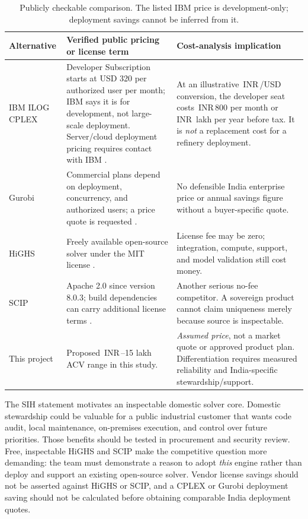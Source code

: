 \documentclass[11pt,a4paper]{article}
\newcommand{\inr}{\ifmmode\text{INR}\,\else INR\,\fi}
\newcommand{\lac}{\ifmmode\,\text{lakh}\else\,lakh\fi}
\begin{document}
\begin{table}[htbp]
\centering
\caption{Publicly checkable comparison. The listed IBM price is development-only; deployment savings cannot be inferred from it.}
\label{tab:competitors}
\small
\begin{tabularx}{\textwidth}{@{}p{30mm}p{47mm}X@{}}
\toprule
Alternative & Verified public pricing or license term & Cost-analysis implication\\
\midrule
IBM ILOG CPLEX & Developer Subscription starts at USD 320 per authorized user per month; IBM says it is for development, not large-scale deployment. Server/cloud deployment pricing requires contact with IBM \cite{ibmprice}. & At an illustrative \inr90/USD conversion, the developer seat costs \inr28{,}800 per month or \inr3.456\lac{} per year before tax. It is \emph{not} a replacement cost for a refinery deployment.\\
Gurobi & Commercial plans depend on deployment, concurrency, and authorized users; a price quote is requested \cite{gurobiprice}. & No defensible India enterprise price or annual savings figure without a buyer-specific quote.\\
HiGHS & Freely available open-source solver under the MIT license \cite{highs}. & License fee may be zero; integration, compute, support, and model validation still cost money.\\
SCIP & Apache 2.0 since version 8.0.3; build dependencies can carry additional license terms \cite{scip}. & Another serious no-fee competitor. A sovereign product cannot claim uniqueness merely because source is inspectable.\\
This project & Proposed \inr5--15\lac{} ACV range in this study. & \emph{Assumed price}, not a market quote or approved product plan. Differentiation requires measured reliability and India-specific stewardship/support.\\
\bottomrule
\end{tabularx}
\end{table}

The SIH statement motivates an inspectable domestic solver core. Domestic stewardship could be valuable for a public industrial customer that wants code audit, local maintenance, on-premises execution, and control over future priorities. Those benefits should be tested in procurement and security review. Free, inspectable HiGHS and SCIP make the competitive question more demanding: the team must demonstrate a reason to adopt \emph{this} engine rather than deploy and support an existing open-source solver. Vendor license savings should not be asserted against HiGHS or SCIP, and a CPLEX or Gurobi deployment saving should not be calculated before obtaining comparable India deployment quotes.
\end{document}
